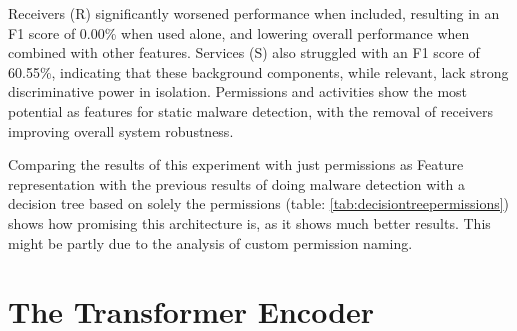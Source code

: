 Receivers (R) significantly worsened performance when included, 
resulting in an F1 score of 0.00\% when used alone, and lowering overall 
performance when combined with other features. 
Services (S) also struggled with an F1 score of 60.55\%, 
indicating that these background components, while relevant, 
lack strong discriminative power in isolation. 
Permissions and activities show the most potential as features for static malware detection, 
with the removal of receivers improving overall system robustness.

Comparing the results of this experiment with just permissions as Feature representation with 
the previous results of doing malware detection with a decision tree based on solely 
the permissions (table: \ref{tab:decisiontreepermissions}) shows how promising this architecture is, 
as it shows much better results.
This might be partly due to the analysis of custom permission naming.


\section{The Transformer Encoder}

\label{sec:tran_enc}

\begin{table}[b!]
    \caption{\label{tab:apk_representation_results_unfrozen}%
    Performance of different APK representations using \emph{unfrozen} ModernBERT embeddings. Features are extracted from the Android manifest.xml (A=Activities, P=Permissions, R=Receivers, S=Services). The encoder was also trained through backpropagation in this experiment.}
\end{table}

